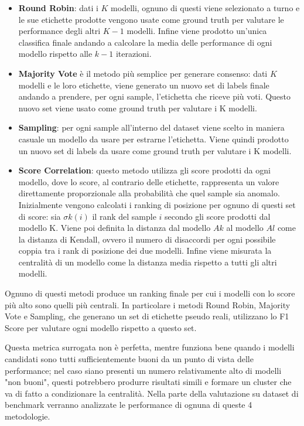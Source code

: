 \begin{itemize}
	\item \textbf{Round Robin}: dati i $K$ modelli, ognuno di questi viene selezionato a turno e le sue etichette prodotte vengono usate come ground truth per valutare le performance degli altri $K-1$ modelli. Infine viene prodotto un'unica classifica finale andando a calcolare la media delle performance di ogni modello rispetto alle $k-1$ iterazioni. 
	\item \textbf{Majority Vote} è il metodo più semplice per generare consenso: dati $K$ modelli e le loro etichette, viene generato un nuovo set di labels finale andando a prendere, per ogni sample, l'etichetta che riceve più voti. Questo nuovo set viene usato come ground truth per valutare i K modelli.
	\item \textbf{Sampling}: per ogni sample all'interno del dataset viene scelto in maniera casuale un modello da usare per estrarne l'etichetta. Viene quindi prodotto un nuovo set di labels da usare come ground truth per valutare i K modelli.
	\item \textbf{Score Correlation}: questo metodo utilizza gli score prodotti da ogni modello, dove lo score, al contrario delle etichette, rappresenta un valore direttamente proporzionale alla probabilità che quel sample sia anomalo. Inizialmente vengono calcolati i ranking di posizione per ognuno di questi set di score: sia ${\sigma}k(i)$ il rank del sample $i$ secondo gli score prodotti dal modello K. Viene poi definita la distanza dal modello $Ak$ al modello $Al$ come la distanza di Kendall, ovvero il numero di disaccordi per ogni possibile coppia tra i rank di posizione dei due modelli. Infine viene misurata la centralità di un modello come la distanza media rispetto a tutti gli altri modelli.
\end{itemize}

Ognuno di questi metodi produce un ranking finale per cui i modelli con lo score più alto sono quelli più centrali. In particolare i metodi Round Robin, Majority Vote e Sampling, che generano un set di etichette pseudo reali, utilizzano lo F1 Score per valutare ogni modello rispetto a questo set.

Questa metrica surrogata non è perfetta, mentre funziona bene quando i modelli candidati sono tutti sufficientemente buoni da un punto di vista delle performance; nel caso siano presenti un numero relativamente alto di modelli "non buoni", questi potrebbero produrre risultati simili e formare un cluster che va di fatto a condizionare la centralità.
Nella parte della valutazione su dataset di benchmark verranno analizzate le performance di ognuna di queste 4 metodologie.


